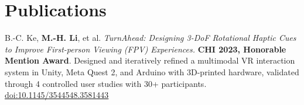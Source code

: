 \documentclass[letterpaper,11pt]{article}
\begin{document}
\section{Publications}
\small B.-C. Ke, \textbf{M.-H. Li}, et al. \textit{TurnAhead: Designing 3-DoF Rotational Haptic Cues to Improve First-person Viewing (FPV) Experiences.} \textbf{CHI 2023, Honorable Mention Award}. Designed and iteratively refined a multimodal VR interaction system in Unity, Meta Quest 2, and Arduino with 3D-printed hardware, validated through 4 controlled user studies with 30+ participants. \href{https://dl.acm.org/doi/10.1145/3544548.3581443}{doi:10.1145/3544548.3581443}
\end{document}
